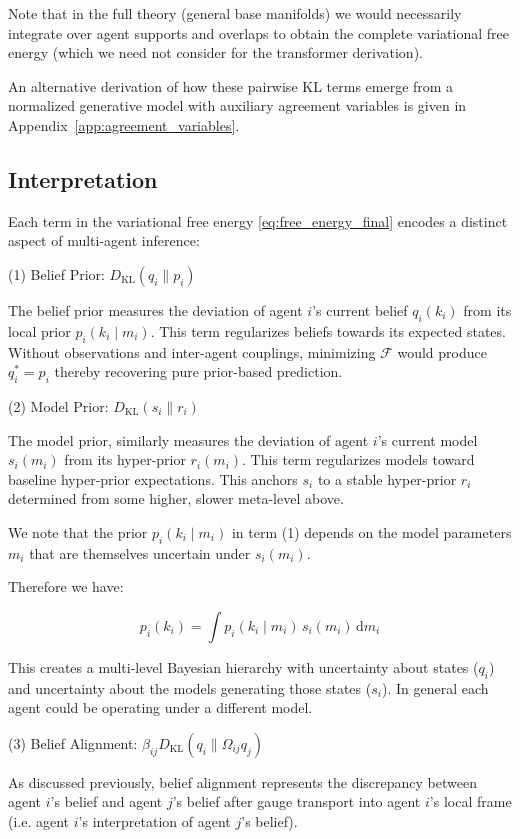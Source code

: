 \documentclass[twoside,11pt]{article}
\begin{document}
Note that in the full theory  (general base manifolds) we would necessarily integrate over agent supports and overlaps to obtain the complete variational free energy (which we need not consider for the transformer derivation).  

An alternative derivation of how these pairwise KL terms emerge from a normalized generative model with auxiliary agreement variables is given in Appendix~\ref{app:agreement_variables}.

\subsection{Interpretation}
Each term in the variational free energy \eqref{eq:free_energy_final} encodes a distinct aspect of multi-agent inference:

(1) Belief Prior: $D_{\mathrm{KL}}(q_i \| p_i)$

The belief prior measures the deviation of agent $i$'s current belief $q_i(k_i)$ from its local prior $p_i(k_i \mid m_i)$. This term regularizes beliefs towards its expected states. Without observations and inter-agent couplings, minimizing $\mathcal{F}$ would produce $q_i^* = p_i$ thereby recovering pure prior-based prediction.

(2) Model Prior: $D_{\mathrm{KL}}(s_i \| r_i)$

The model prior, similarly measures the deviation of agent $i$'s current model $s_i(m_i)$ from its hyper-prior $r_i(m_i)$. This term regularizes models toward baseline hyper-prior expectations. This anchors $s_i$ to a stable hyper-prior $r_i$ determined from some higher, slower meta-level above.

We note that the prior $p_i(k_i \mid m_i)$ in term (1) depends on the model parameters $m_i$ that are themselves uncertain under $s_i(m_i)$. 

Therefore we have:

\begin{equation}
p_i(k_i) = \int p_i(k_i \mid m_i) \, s_i(m_i) \, \mathrm{d}m_i
\label{eq:hierarchical_prior}
\end{equation}

This creates a multi-level Bayesian hierarchy with uncertainty about states ($q_i$) and uncertainty about the models generating those states ($s_i$). In general each agent could be operating under a different model.

(3) Belief Alignment: $\beta_{ij} D_{\mathrm{KL}}(q_i \| \Omega_{ij} q_j)$

As discussed previously, belief alignment represents the discrepancy between agent $i$'s belief and agent $j$'s belief after gauge transport into agent $i$'s local frame (i.e. agent $i$'s interpretation of agent $j$'s belief).
\end{document}
